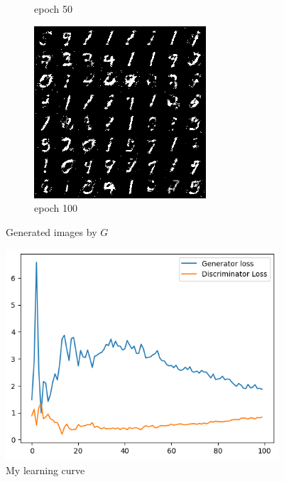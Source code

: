 \documentclass[a4paper]{article}
\theoremstyle{definition}
\newenvironment{soln}{
	\leavevmode\color{blue}\ignorespaces
}{}
\begin{document}
\begin{enumerate} [label=(\alph*)]
\begin{figure}[H]
\begin{subfigure}[b]{0.3\textwidth}
				\caption{epoch 50}
			\end{subfigure}
			\hfill
			\begin{subfigure}[b]{0.3\textwidth}
				\centering
				\includegraphics[width=\textwidth]{gan_q1_epoch100.png}
				\caption{epoch 100}
			\end{subfigure}
			\caption{Generated images by $G$}
			\label{fig:three graphs}
		\end{figure}
		
		
		\begin{soln}
			
			\begin{figure}[H]
				\centering
				\includegraphics[width=4in]{1a_curve.png}
				\caption{My learning curve}
				\label{fig:gan_q1_loss}
			\end{figure}
			

\end{soln}
\end{enumerate}
\end{document}
